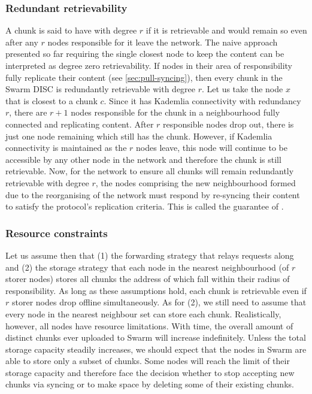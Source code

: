 \subsubsection{Redundant retrievability}

A chunk is said to have  with degree $r$ if it is retrievable and would remain so even after any $r$ nodes responsible for it leave the network. The naive approach presented so far requiring the single closest node to keep the content can be interpreted as degree zero retrievability. If nodes in their area of responsibility fully replicate their content (see \ref{sec:pull-syncing}), then every chunk in the Swarm DISC is redundantly retrievable with degree $r$. Let us take the node $x$ that is closest to a chunk $c$. Since it has Kademlia connectivity with redundancy $r$, there are $r+1$ nodes responsible for the chunk in a neighbourhood fully connected and replicating content. After $r$ responsible nodes drop out, there is just one node remaining which still has the chunk. However, if Kademlia connectivity is maintained as the $r$ nodes leave, this node will continue to be accessible by any other node in the network and therefore the chunk is still retrievable. Now, for the network to ensure all chunks will remain redundantly retrievable with degree $r$, the nodes comprising the new neighbourhood formed due to the reorganising of the network must respond by re-syncing their content to satisfy the protocol's replication criteria. This is called the guarantee of .

\subsubsection{Resource constraints}

Let us assume then that (1) the forwarding strategy that relays requests along  and (2) the storage strategy that each node in the nearest neighbourhood (of $r$ storer nodes) stores all chunks the address of which fall within their radius of responsibility. As long as these assumptions hold, each chunk is retrievable even if $r$ storer nodes drop offline simultaneously. As for (2), we still need to assume that every node in the nearest neighbour set can store each chunk. Realistically, however, all nodes have resource limitations. With time, the overall amount of distinct chunks ever uploaded to Swarm will increase indefinitely. Unless the total storage capacity steadily increases, we should expect that the nodes in Swarm are able to store only a subset of chunks. Some nodes will reach the limit of their storage capacity and therefore face the decision whether to stop accepting new chunks via syncing or to make space by deleting some of their existing chunks. 

